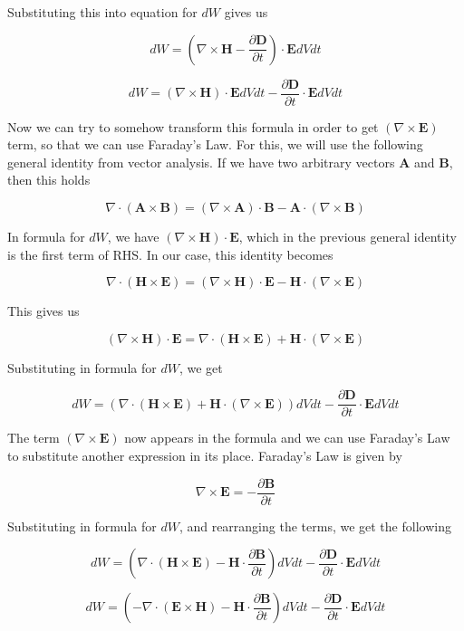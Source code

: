 \documentclass{article}
\begin{document}
Substituting this into equation for $dW$ gives us

\[ dW = (\nabla \times \mathbf{H} - \frac{\partial \mathbf{D}}{\partial t}) \cdot \mathbf{E} dVdt \]

\[ dW = (\nabla \times \mathbf{H}) \cdot \mathbf{E}dVdt - \frac{\partial \mathbf{D}}{\partial t} \cdot \mathbf{E}dVdt \]

Now we can try to somehow transform this formula in order to get $(\nabla \times \mathbf{E})$ term, so that we can use Faraday's Law. For this, we will use the following general identity from vector analysis. If we have two arbitrary vectors $\mathbf{A}$ and $\mathbf{B}$, then this holds

\[ \nabla \cdot (\mathbf{A} \times \mathbf{B}) = (\nabla \times \mathbf{A}) \cdot \mathbf{B} - \mathbf{A} \cdot (\nabla \times \mathbf{B}) \]

In formula for $dW$, we have $(\nabla \times \mathbf{H}) \cdot \mathbf{E}$, which in the previous general identity is the first term of RHS. In our case, this identity becomes

\[ \nabla \cdot (\mathbf{H} \times \mathbf{E}) = (\nabla \times \mathbf{H}) \cdot \mathbf{E} - \mathbf{H} \cdot (\nabla \times \mathbf{E}) \]

This gives us

\[ (\nabla \times \mathbf{H}) \cdot \mathbf{E} = \nabla \cdot (\mathbf{H} \times \mathbf{E}) + \mathbf{H} \cdot (\nabla \times \mathbf{E}) \]

Substituting in formula for $dW$, we get

\[ dW = (\nabla \cdot (\mathbf{H} \times \mathbf{E}) + \mathbf{H} \cdot (\nabla \times \mathbf{E}))dVdt - \frac{\partial \mathbf{D}}{\partial t} \cdot \mathbf{E}dVdt \]

The term $(\nabla \times \mathbf{E})$ now appears in the formula and we can use Faraday's Law to substitute another expression in its place. Faraday's Law is given by

\[ \nabla \times \mathbf{E} = -\frac{\partial \mathbf{B}}{\partial t} \]

Substituting in formula for $dW$, and rearranging the terms, we get the following

\[ dW = (\nabla \cdot (\mathbf{H} \times \mathbf{E}) - \mathbf{H} \cdot \frac{\partial \mathbf{B}}{\partial t})dVdt - \frac{\partial \mathbf{D}}{\partial t} \cdot \mathbf{E}dVdt \]

\[ dW = (- \nabla \cdot (\mathbf{E} \times \mathbf{H}) - \mathbf{H} \cdot \frac{\partial \mathbf{B}}{\partial t})dVdt - \frac{\partial \mathbf{D}}{\partial t} \cdot \mathbf{E}dVdt \]
\end{document}
